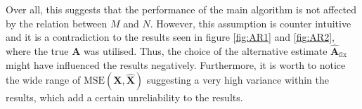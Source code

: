 \noindent 
Over all, this suggests that the performance of the main algorithm is not affected by the relation between $M$ and $N$.
However, this assumption is counter intuitive and it is a contradiction to the results seen in figure \ref{fig:AR1} and \ref{fig:AR2}, where the true $\mathbf{A}$ was utilised. 
Thus, the choice of the alternative estimate $\hat{\mathbf{A}}_{\text{fix}}$ might have influenced the results negatively. 
Furthermore, it is worth to notice the wide range of $\text{MSE}(\mathbf{X}, \hat{\mathbf{X}})$ suggesting a very high variance within the results, which add a certain unreliability to the results.    